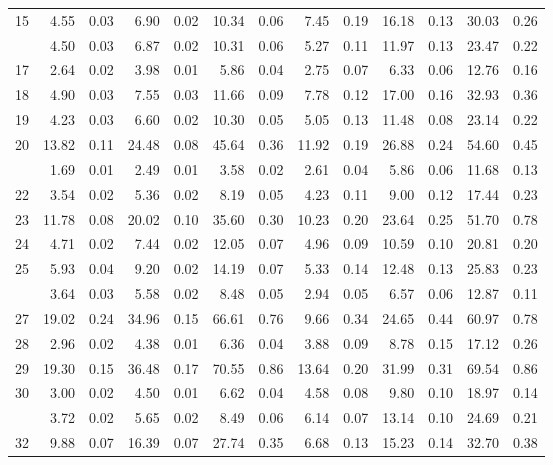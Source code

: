 \begin{tabular}[t]{rrrrrrrrrrrrr}
15 & 4.55 & 0.03 & 6.90 & 0.02 & 10.34 & 0.06 & 7.45 & 0.19 & 16.18 & 0.13 & 30.03 & 0.26\\
\addlinespace
16 & 4.50 & 0.03 & 6.87 & 0.02 & 10.31 & 0.06 & 5.27 & 0.11 & 11.97 & 0.13 & 23.47 & 0.22\\
17 & 2.64 & 0.02 & 3.98 & 0.01 & 5.86 & 0.04 & 2.75 & 0.07 & 6.33 & 0.06 & 12.76 & 0.16\\
18 & 4.90 & 0.03 & 7.55 & 0.03 & 11.66 & 0.09 & 7.78 & 0.12 & 17.00 & 0.16 & 32.93 & 0.36\\
19 & 4.23 & 0.03 & 6.60 & 0.02 & 10.30 & 0.05 & 5.05 & 0.13 & 11.48 & 0.08 & 23.14 & 0.22\\
20 & 13.82 & 0.11 & 24.48 & 0.08 & 45.64 & 0.36 & 11.92 & 0.19 & 26.88 & 0.24 & 54.60 & 0.45\\
\addlinespace
21 & 1.69 & 0.01 & 2.49 & 0.01 & 3.58 & 0.02 & 2.61 & 0.04 & 5.86 & 0.06 & 11.68 & 0.13\\
22 & 3.54 & 0.02 & 5.36 & 0.02 & 8.19 & 0.05 & 4.23 & 0.11 & 9.00 & 0.12 & 17.44 & 0.23\\
23 & 11.78 & 0.08 & 20.02 & 0.10 & 35.60 & 0.30 & 10.23 & 0.20 & 23.64 & 0.25 & 51.70 & 0.78\\
24 & 4.71 & 0.02 & 7.44 & 0.02 & 12.05 & 0.07 & 4.96 & 0.09 & 10.59 & 0.10 & 20.81 & 0.20\\
25 & 5.93 & 0.04 & 9.20 & 0.02 & 14.19 & 0.07 & 5.33 & 0.14 & 12.48 & 0.13 & 25.83 & 0.23\\
\addlinespace
26 & 3.64 & 0.03 & 5.58 & 0.02 & 8.48 & 0.05 & 2.94 & 0.05 & 6.57 & 0.06 & 12.87 & 0.11\\
27 & 19.02 & 0.24 & 34.96 & 0.15 & 66.61 & 0.76 & 9.66 & 0.34 & 24.65 & 0.44 & 60.97 & 0.78\\
28 & 2.96 & 0.02 & 4.38 & 0.01 & 6.36 & 0.04 & 3.88 & 0.09 & 8.78 & 0.15 & 17.12 & 0.26\\
29 & 19.30 & 0.15 & 36.48 & 0.17 & 70.55 & 0.86 & 13.64 & 0.20 & 31.99 & 0.31 & 69.54 & 0.86\\
30 & 3.00 & 0.02 & 4.50 & 0.01 & 6.62 & 0.04 & 4.58 & 0.08 & 9.80 & 0.10 & 18.97 & 0.14\\
\addlinespace
31 & 3.72 & 0.02 & 5.65 & 0.02 & 8.49 & 0.06 & 6.14 & 0.07 & 13.14 & 0.10 & 24.69 & 0.21\\
32 & 9.88 & 0.07 & 16.39 & 0.07 & 27.74 & 0.35 & 6.68 & 0.13 & 15.23 & 0.14 & 32.70 & 0.38\\
\bottomrule
\end{tabular}

